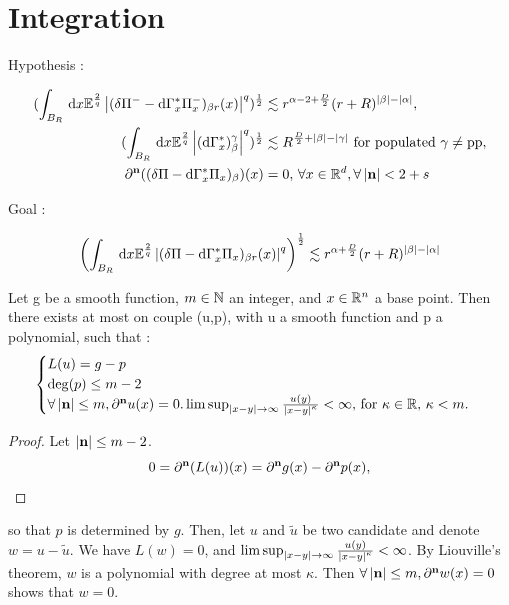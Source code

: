 \section{Integration}


Hypothesis :

\begin{align}
    (\int_{B_R} \,\mathrm{d} x \mathbb{E}^{\frac{2}{q}}\left| (\delta \Pi^- - \mathrm{d}\Gamma^*_x \Pi_x^-)_{\beta r}(x) \right|^q)^\frac{1}{2} &\lesssim r^{\alpha - 2 + \frac{D}{2}}(r+R)^{\left| \beta \right| - \left| \alpha \right|}, \\
    (\int_{B_R} \,\mathrm{d} x \mathbb{E}^{\frac{2}{q}}\left| (\mathrm{d}\Gamma^*_x)^\gamma_\beta \right|^q)^\frac{1}{2} &\lesssim R^{\frac{D}{2}+\left| \beta \right| - \left| \gamma \right|} \text{ for populated }\gamma \neq \text{pp}, \label{coeff_estimate} \\
     \partial^{\mathbf{n}}((\delta \Pi - \mathrm{d}\Gamma^*_x \Pi_x)_\beta)(x) &= 0, \, \forall x \in \mathbb{R}^d, \forall \left| \mathbf{n} \right|<2+s \label{qualitative_vanishing}
\end{align}

Goal :

\begin{equation}
    \label{reconstruction_deltaPi}
        \left(\int_{B_R} \,\mathrm{d} x \mathbb{E}^{\frac{2}{q}}\left| (\delta \Pi - \mathrm{d}\Gamma^*_x \Pi_x)_{\beta r}(x) \right|^q \right)^\frac{1}{2} \lesssim r^{\alpha + \frac{D}{2}}(r+R)^{\left| \beta \right| - \left| \alpha \right|} 
\end{equation}


\begin{lemma}[Liouville]
    Let g be a smooth function, $m\in \mathbb{N}$ an integer, and $x\in \mathbb{R}^n$ a base point.
    Then there exists at most on couple (u,p), with u a smooth function and p a polynomial, such that :
    $$
    \begin{cases}
        L(u)= g - p \\
        \operatorname*{deg}(p)\leq m-2 \\
        \forall \left| \mathbf{n} \right| \leq m, \partial^{\mathbf{n}} u(x) = 0.
        \limsup_{\left| x-y \right|\to \infty} \frac{u(y)}{\left| x-y \right|^\kappa} < \infty, \, \text{for }\kappa\in \mathbb{R}, \, \kappa<m.
    \end{cases}
    $$
\end{lemma}

\begin{proof}
    Let $\left| \mathbf{n} \right| \leq m - 2$.
    \begin{equation*}
        0 = \partial^{\mathbf{n}}(L(u))(x) = \partial^{\mathbf{n}} g(x) -\partial^{\mathbf{n}} p(x),
    \end{equation*}
\end{proof}
so that $p$ is determined by $g$.
Then, let $u$ and $\tilde{u}$ be two candidate and denote $w = u - \tilde{u}$.
We have $L(w) = 0$, and $\limsup_{\left| x-y \right|\to \infty} \frac{u(y)}{\left| x-y \right|^\kappa} < \infty$. By Liouville's theorem, $w$ is a polynomial with degree at most $\kappa$.
Then $\forall \left| \mathbf{n} \right| \leq m, \partial^{\mathbf{n}} w(x) = 0$ shows that $w=0$.

